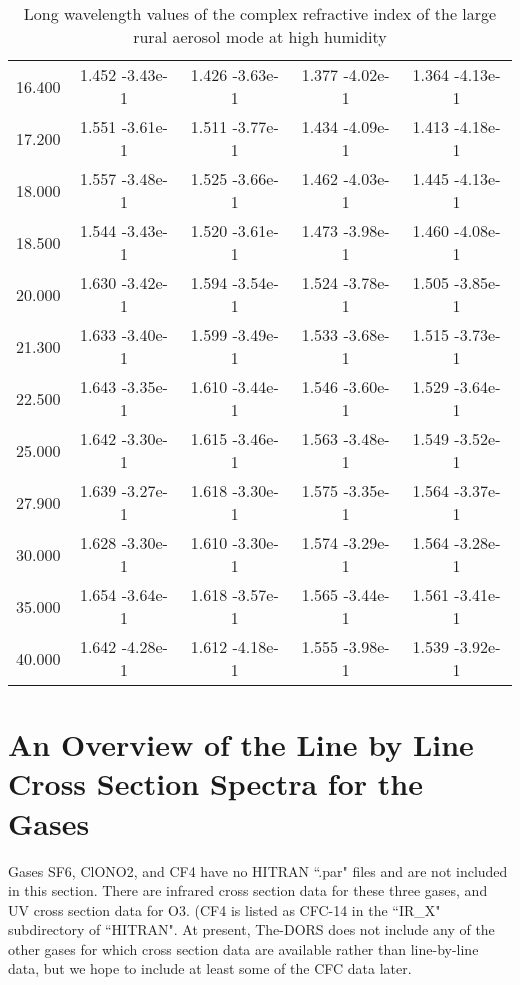 \documentclass[12pt]{article}
\begin{document}
\begin{center}
\begin{table}
\begin{tabular}{| c | c | c | c | c |  }
16.400  &   1.452   -3.43e-1 &   1.426   -3.63e-1  &  1.377   -4.02e-1  &  1.364   -4.13e-1  \\
17.200  &   1.551   -3.61e-1  &  1.511   -3.77e-1 &   1.434   -4.09e-1 &   1.413   -4.18e-1  \\
18.000  &   1.557   -3.48e-1 &   1.525   -3.66e-1 &   1.462   -4.03e-1 &   1.445   -4.13e-1  \\
18.500  &   1.544   -3.43e-1 &   1.520   -3.61e-1 &   1.473   -3.98e-1 &   1.460   -4.08e-1  \\
20.000  &   1.630   -3.42e-1 &   1.594   -3.54e-1  &  1.524   -3.78e-1 &   1.505   -3.85e-1  \\
21.300  &   1.633   -3.40e-1  &  1.599   -3.49e-1 &   1.533   -3.68e-1 &   1.515   -3.73e-1  \\
22.500  &   1.643   -3.35e-1  &  1.610   -3.44e-1 &   1.546   -3.60e-1  &  1.529   -3.64e-1  \\
25.000  &   1.642   -3.30e-1  &  1.615   -3.46e-1 &   1.563   -3.48e-1  &  1.549   -3.52e-1  \\
27.900  &   1.639   -3.27e-1  &  1.618   -3.30e-1 &   1.575   -3.35e-1  &  1.564   -3.37e-1  \\
30.000  &   1.628   -3.30e-1 &   1.610   -3.30e-1 &   1.574   -3.29e-1  &  1.564   -3.28e-1  \\
35.000  &   1.654   -3.64e-1 &   1.618   -3.57e-1  &  1.565   -3.44e-1  &  1.561   -3.41e-1  \\
40.000  &   1.642   -4.28e-1 &   1.612   -4.18e-1  &  1.555   -3.98e-1  &  1.539   -3.92e-1 \\
\hline
\end{tabular}
\caption{Long wavelength values of the complex refractive index of the large rural aerosol mode at high humidity}
\end{table}
\end{center}

\section{An Overview of the Line by Line Cross Section Spectra for the Gases}

Gases SF6, ClONO2, and CF4 have no HITRAN ``.par" files and are not included in this section.
There are infrared cross section data for these three gases, and UV cross section data for O3.
(CF4 is listed as CFC-14 in the ``IR\_X" subdirectory of ``HITRAN".
At present, The-DORS does not include any of the other gases for which cross section data are available
rather than line-by-line data, but we hope to include at least some of the CFC data later.
\end{document}

